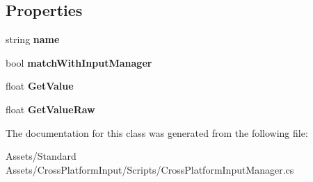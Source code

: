 \subsection*{Properties}
\begin{DoxyCompactItemize}
\item 
string {\bfseries name}\hypertarget{class_unity_standard_assets_1_1_cross_platform_input_1_1_cross_platform_input_manager_1_1_virtual_axis_a176a271ea7cb1d9b52194ac0894c1b7b}{}\label{class_unity_standard_assets_1_1_cross_platform_input_1_1_cross_platform_input_manager_1_1_virtual_axis_a176a271ea7cb1d9b52194ac0894c1b7b}

\item 
bool {\bfseries match\+With\+Input\+Manager}\hypertarget{class_unity_standard_assets_1_1_cross_platform_input_1_1_cross_platform_input_manager_1_1_virtual_axis_a0a36c8bbe98e6f8d28c92e3e259019c6}{}\label{class_unity_standard_assets_1_1_cross_platform_input_1_1_cross_platform_input_manager_1_1_virtual_axis_a0a36c8bbe98e6f8d28c92e3e259019c6}

\item 
float {\bfseries Get\+Value}\hypertarget{class_unity_standard_assets_1_1_cross_platform_input_1_1_cross_platform_input_manager_1_1_virtual_axis_a51bd6f837943d701ba4da4048873e88d}{}\label{class_unity_standard_assets_1_1_cross_platform_input_1_1_cross_platform_input_manager_1_1_virtual_axis_a51bd6f837943d701ba4da4048873e88d}

\item 
float {\bfseries Get\+Value\+Raw}\hypertarget{class_unity_standard_assets_1_1_cross_platform_input_1_1_cross_platform_input_manager_1_1_virtual_axis_a8a528d70054dedde487f12a2a8817bab}{}\label{class_unity_standard_assets_1_1_cross_platform_input_1_1_cross_platform_input_manager_1_1_virtual_axis_a8a528d70054dedde487f12a2a8817bab}

\end{DoxyCompactItemize}


The documentation for this class was generated from the following file\+:\begin{DoxyCompactItemize}
\item 
Assets/\+Standard Assets/\+Cross\+Platform\+Input/\+Scripts/Cross\+Platform\+Input\+Manager.\+cs\end{DoxyCompactItemize}
